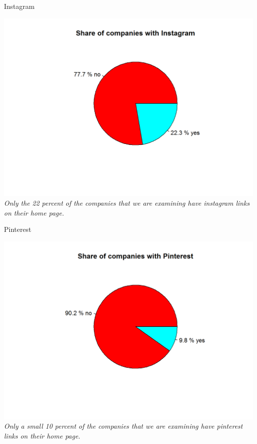 \documentclass{article}
\begin{document}
\begin{table}[H]
\centering
\caption{Instagram}
\begin{center}
\includegraphics[scale=0.5]{../R/photos/14_inst_dist.png}  \\
\textit{Only the 22 percent of the companies that we are examining have instagram links on their home page.}
\end{center}
\end{table}

\begin{table}[H]
\centering
\caption{Pinterest}
\begin{center}
\includegraphics[scale=0.5]{../R/photos/16_pint_dist.png}  \\
\textit{Only a small 10 percent of the companies that we are examining have pinterest links on their home page.}
\end{center}
\end{table}
\end{document}
